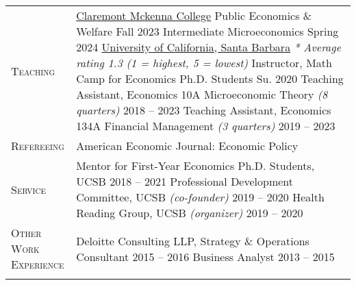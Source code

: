 \documentclass[11pt]{article}
\newcommand{\xspace}{23pt}
\begin{document}
\begin{tabularx}{\textwidth}{@{}Y Z@{}}
	\textsc{Teaching}  & 
	\uline{Claremont Mckenna College}
	\vspace{3pt} \newline
	Public Economics \& Welfare \hfill Fall 2023%
	\vspace{3pt} \newline
	Intermediate Microeconomics \hfill Spring 2024%
	\vspace{10pt} \newline
	\uline{University of California, Santa Barbara}
	\vspace{3pt} \newline
	\textit{* Average rating 1.3 (1 = highest, 5 = lowest)}
	\vspace{3pt} \newline
	Instructor, Math Camp for Economics Ph.D. Students \hfill Su. 2020%
	\vspace{3pt} \newline
	Teaching Assistant, Economics 10A Microeconomic Theory \textit{(8 quarters)} \hfill 2018 -- 2023%
	\vspace{3pt} \newline
	Teaching Assistant, Economics 134A Financial Management \textit{(3 	quarters)}  \hfill 2019 -- 2023%
	\\ \addlinespace[\xspace] 
	
	\textsc{Refereeing}  & 
	American Economic Journal: Economic Policy
	 \\ \addlinespace[\xspace] 
	
	\textsc{Service} & 
	Mentor for First-Year Economics Ph.D. Students, UCSB \hfill 2018 -- 2021%
	\vspace{3pt} \newline
	Professional Development Committee, UCSB \textit{(co-founder)}  \hfill 2019 -- 2020%
	\vspace{3pt} \newline
	Health Reading Group, UCSB \textit{(organizer)} \hfill 2019 -- 2020%
	\\ \addlinespace[\xspace] 
	

	\newpage

	\textsc{Other Work \newline Experience}  & 
	Deloitte Consulting LLP, Strategy \& Operations
	\vspace{3pt} \newline
	Consultant \hfill 2015 -- 2016%
	\vspace{3pt} \newline
	Business Analyst \hfill 2013 -- 2015%
	\\ \addlinespace[\xspace] 
	

\end{tabularx}
\end{document}
